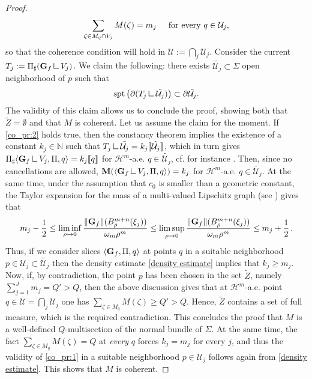\documentclass[a4paper,11pt,reqno]{amsart}
\theoremstyle{definition}
\numberwithin{equation}{section}
\numberwithin{subsection}{section}
\newcommand{\mres}{\mathbin{\vrule height 1.6ex depth 0pt width
0.13ex\vrule height 0.13ex depth 0pt width 1.3ex}}
\newcommand{\U}{\mathcal{U}}
\newcommand{\M}{\mathbf{M}}
\newcommand{\spt}{\mathrm{spt}}
\newcommand{\Ha}{\mathcal{H}}
\begin{document}
\begin{proof}
\begin{equation} \label{co_pr:1}
\sum_{\zeta \in M_{q} \cap V_{j}} M(\zeta) = m_{j} \hspace{0.5cm} \mbox{for every } q \in \U_{j},
\end{equation}  
so that the coherence condition will hold in $\U := \bigcap_{j} \U_{j}$. Consider the current $T_{j} := \Pi_{\sharp}({\bf G}_{f} \mres V_{j})$. We claim the following: there exists $\tilde{\U_{j}} \subset \Sigma$ open neighborhood of $p$ such that 
\begin{equation} \label{co_pr:2}
\spt\left( \partial(T_{j} \mres \tilde{\U_{j}})\right) \subset \partial \tilde{\U_{j}}.
\end{equation}
The validity of this claim allows us to conclude the proof, showing both that $\tilde Z = \emptyset$ and that $M$ is coherent. Let us assume the claim for the moment. If \eqref{co_pr:2} holds true, then the constancy theorem implies the existence of a constant $k_{j} \in \mathbb{N}$ such that $T_{j} \mres \tilde{\U_{j}} = k_{j} \llbracket \tilde{\U_j} \rrbracket$, which in turn gives $\Pi_{\sharp} \langle {\bf G}_f \mres V_j, \Pi, q \rangle = k_j  \llbracket q \rrbracket$ for $\Ha^m$-a.e. $q \in \tilde{\U_j}$, cf. for instance \cite[Theorem 4.3.2(7)]{Federer69}. Then, since no cancellations are allowed, $\M(\langle {\bf G}_f \mres V_j, \Pi, q \rangle ) = k_j$ for $\Ha^m$-a.e. $q \in \tilde{\U_j}$. At the same time, under the assumption that $c_0$ is smaller than a geometric constant, the Taylor expansion for the mass of a multi-valued Lipschitz graph (see \cite[Corollary 3.3]{DLS13a}) gives that
\begin{equation} \label{density estimate}
m_j - \frac{1}{2} \leq \liminf_{\rho \to 0} \frac{\|{\bf G}_f\|(B^{m+n}_{\rho}(\xi_j))}{\omega_m \rho^m} \leq \limsup_{\rho \to 0} \frac{\|{\bf G}_f\|(B^{m+n}_{\rho}(\xi_j))}{\omega_m \rho^m} \leq m_j + \frac{1}{2}\,.
\end{equation}
Thus, if we consider slices $\langle {\bf G}_f, \Pi, q \rangle$ at points $q$ in a suitable neighborhood $p \in \U_j \subset \tilde{\U_j}$ then the density estimate \eqref{density estimate} implies that $k_j \geq m_j$. Now, if, by contradiction, the point $p$ has been chosen in the set $\tilde Z$, namely $\sum_{j=1}^J m_j = Q' > Q$, then the above discussion gives that at $\Ha^m$-a.e. point $q \in \U = \bigcap_j \U_j$ one has $\sum_{\zeta \in M_q} M(\zeta) \geq Q' > Q$. Hence, $\tilde{Z}$ contains a set of full measure, which is the required contradiction. This concludes the proof that $M$ is a well-defined $Q$-multisection of the normal bundle of $\Sigma$. At the same time, the fact $\sum_{\zeta \in M_q} M(\zeta) = Q$ at \emph{every} $q$ forces $k_j = m_j$ for every $j$, and thus the validity of \eqref{co_pr:1} in a suitable neighborhood $p \in \U_j$ follows again from \eqref{density estimate}. This shows that $M$ is coherent.


\end{proof}
\end{document}
